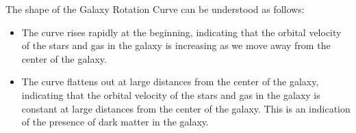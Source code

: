 The shape of the Galaxy Rotation Curve can be understood as follows:
\begin{itemize}
	\item The curve rises rapidly at the beginning, indicating that the orbital velocity of the stars and gas in the galaxy is increasing as we move away from the center of the galaxy.
	\item The curve flattens out at large distances from the center of the galaxy, indicating that the orbital velocity of the stars and gas in the galaxy is constant at large distances from the center of the galaxy. This is an indication of the presence of dark matter in the galaxy.
\end{itemize}

